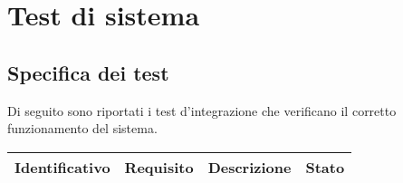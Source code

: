 \section{Test di sistema}\label{sec:test-di-sistema}
\setcounter{rowcount}{0}

\subsection{Specifica dei test}\label{subsec:specifica-dei-test-sistema}
Di seguito sono riportati i test d'integrazione che verificano il corretto funzionamento del sistema.
\begin{center}
    \begin{longtable}{ | C{2.5cm} |C{2cm} |C{7cm} |C{1.5cm}|} \hline
        \textbf{Identificativo} & \textbf{Requisito}   & \textbf{Descrizione} & \textbf{Stato} \\\hline


\end{longtable}
\end{center}
